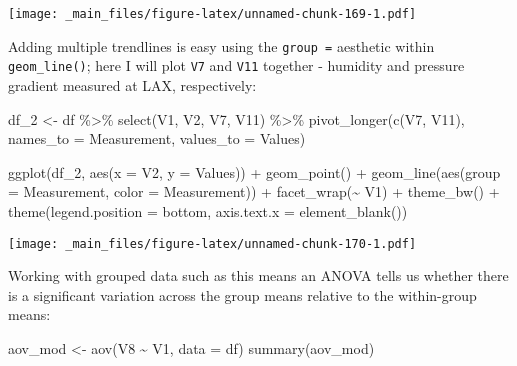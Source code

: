 \documentclass[
]{book}
\newenvironment{Shaded}{\begin{snugshade}}{\end{snugshade}}
\newcommand{\AttributeTok}[1]{\textcolor[rgb]{0.77,0.63,0.00}{#1}}
\newcommand{\FunctionTok}[1]{\textcolor[rgb]{0.00,0.00,0.00}{#1}}
\newcommand{\NormalTok}[1]{#1}
\newcommand{\OtherTok}[1]{\textcolor[rgb]{0.56,0.35,0.01}{#1}}
\newcommand{\SpecialCharTok}[1]{\textcolor[rgb]{0.00,0.00,0.00}{#1}}
\newcommand{\StringTok}[1]{\textcolor[rgb]{0.31,0.60,0.02}{#1}}
\begin{document}
\texttt{[image: \_main\_files/figure-latex/unnamed-chunk-169-1.pdf]}

Adding multiple trendlines is easy using the \texttt{group\ =} aesthetic within \texttt{geom\_line()}; here I will plot \texttt{V7} and \texttt{V11} together - humidity and pressure gradient measured at LAX, respectively:

\begin{Shaded}
\begin{Highlighting}[]
\NormalTok{df\_2 }\OtherTok{\textless{}{-}}\NormalTok{ df }\SpecialCharTok{\%\textgreater{}\%} \FunctionTok{select}\NormalTok{(V1, V2, V7, V11) }\SpecialCharTok{\%\textgreater{}\%}
  \FunctionTok{pivot\_longer}\NormalTok{(}\FunctionTok{c}\NormalTok{(V7, V11), }
               \AttributeTok{names\_to =} \StringTok{\textquotesingle{}Measurement\textquotesingle{}}\NormalTok{, }
               \AttributeTok{values\_to =} \StringTok{\textquotesingle{}Values\textquotesingle{}}\NormalTok{)}

\FunctionTok{ggplot}\NormalTok{(df\_2, }\FunctionTok{aes}\NormalTok{(}\AttributeTok{x =}\NormalTok{ V2, }\AttributeTok{y =}\NormalTok{ Values)) }\SpecialCharTok{+}
  \FunctionTok{geom\_point}\NormalTok{() }\SpecialCharTok{+} 
  \FunctionTok{geom\_line}\NormalTok{(}\FunctionTok{aes}\NormalTok{(}\AttributeTok{group =}\NormalTok{ Measurement,}
                \AttributeTok{color =}\NormalTok{ Measurement)) }\SpecialCharTok{+}
  \FunctionTok{facet\_wrap}\NormalTok{(}\SpecialCharTok{\textasciitilde{}}\NormalTok{ V1) }\SpecialCharTok{+} \FunctionTok{theme\_bw}\NormalTok{() }\SpecialCharTok{+} 
  \FunctionTok{theme}\NormalTok{(}\AttributeTok{legend.position =} \StringTok{\textquotesingle{}bottom\textquotesingle{}}\NormalTok{,}
        \AttributeTok{axis.text.x =} \FunctionTok{element\_blank}\NormalTok{())}
\end{Highlighting}
\end{Shaded}

\texttt{[image: \_main\_files/figure-latex/unnamed-chunk-170-1.pdf]}

Working with grouped data such as this means an ANOVA tells us whether there is a significant variation across the group means relative to the within-group means:

\begin{Shaded}
\begin{Highlighting}[]
\NormalTok{aov\_mod }\OtherTok{\textless{}{-}} \FunctionTok{aov}\NormalTok{(V8 }\SpecialCharTok{\textasciitilde{}}\NormalTok{ V1, }\AttributeTok{data =}\NormalTok{ df)}
\FunctionTok{summary}\NormalTok{(aov\_mod)}
\end{Highlighting}
\end{Shaded}
\end{document}
